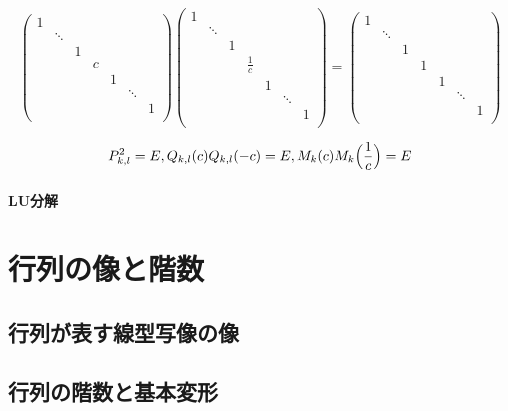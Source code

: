 \[
\begin{pmatrix}
1 & & \\
 & \ddots & \\
 & & 1 \\
 & & & c \\
 & & & & 1 \\
 & & & & & \ddots \\
 & & & & & & 1 \\
\end{pmatrix}
\begin{pmatrix}
1 & & \\
 & \ddots & \\
 & & 1 \\
 & & & \frac{1}{c} \\
 & & & & 1 \\
 & & & & & \ddots \\
 & & & & & & 1 \\
\end{pmatrix}
=
\begin{pmatrix}
1 & & \\
 & \ddots & \\
 & & 1 \\
 & & & 1 \\
 & & & & 1 \\
 & & & & & \ddots \\
 & & & & & & 1 \\
\end{pmatrix}
\]

\[
P_{k,l}^2 = E, Q_{k, l}(c)Q_{k, l}(-c) = E, M_k(c)M_k\Bigl(\frac{1}{c}\Bigr) = E
\]

\paragraph{LU分解}

\section{行列の像と階数}

\subsection{行列が表す線型写像の像}



\subsection{行列の階数と基本変形}

